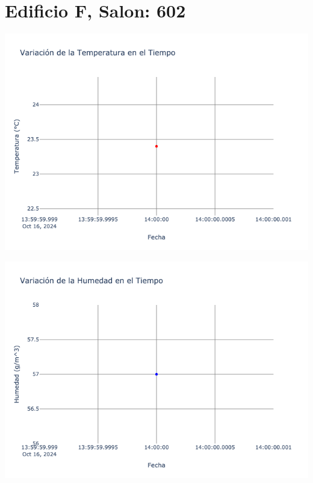 \documentclass{article}
\begin{document}
    \section{Edificio F, Salon: 602}
    \noindent
    \begin{minipage}{0.48\textwidth}
        \centering
        \includegraphics[width=\textwidth]{../img/poli/TS602-90Dias-03-12-2024.png}
    \end{minipage}
    \hfill
    \begin{minipage}{0.48\textwidth}
        \centering
        \includegraphics[width=\textwidth]{../img/poli/HS602-90Dias-03-12-2024.png}
    \end{minipage}
\end{document}
